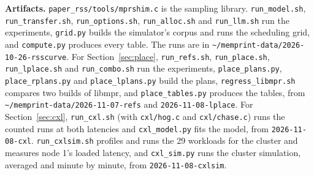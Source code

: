 \documentclass[11pt]{article}
\newcommand{\secref}[1]{Section~\ref{#1}}
\begin{document}
\textbf{Artifacts.} \texttt{paper\_rss/tools/mprshim.c} is the sampling library. \texttt{run\_model.sh},
\texttt{run\_transfer.sh}, \texttt{run\_options.sh}, \texttt{run\_alloc.sh} and \texttt{run\_llm.sh} run the
experiments, \texttt{grid.py} builds the simulator's corpus and runs the scheduling grid, and \texttt{compute.py}
produces every table. The runs are in \texttt{\textasciitilde/memprint-data/2026-10-26-rsscurve}. For
\secref{sec:place}, \texttt{run\_refs.sh}, \texttt{run\_place.sh}, \texttt{run\_lplace.sh} and \texttt{run\_combo.sh}
run the experiments, \texttt{place\_plans.py}, \texttt{place\_rplans.py} and \texttt{place\_lplans.py} build the
plans, \texttt{regress\_libmpr.sh} compares two builds of libmpr, and \texttt{place\_tables.py} produces the tables,
from \texttt{\textasciitilde/memprint-data/2026-11-07-refs} and \texttt{2026-11-08-lplace}. For \secref{sec:cxl},
\texttt{run\_cxl.sh} (with \texttt{cxl/hog.c} and \texttt{cxl/chase.c}) runs the counted runs at both latencies
and \texttt{cxl\_model.py} fits the model, from \texttt{2026-11-08-cxl}. \texttt{run\_cxlsim.sh} profiles and runs the 29
workloads for the cluster and measures node 1's loaded latency, and \texttt{cxl\_sim.py} runs the cluster simulation, averaged and minute by minute,
from \texttt{2026-11-08-cxlsim}.



\end{document}
